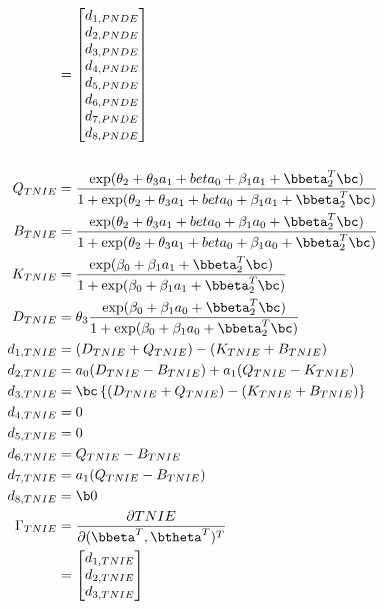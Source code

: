 \documentclass[dvipdfmx,10pt]{article}
\begin{document}
\begin{align*}
  &= \begin{bmatrix}
      d_{1,PNDE}\\
      d_{2,PNDE}\\
      d_{3,PNDE}\\
      d_{4,PNDE}\\
      d_{5,PNDE}\\
      d_{6,PNDE}\\
      d_{7,PNDE}\\
      d_{8,PNDE}\\
    \end{bmatrix}\\
  \\
  Q_{TNIE} &= \frac
      {    \exp(\theta_{2} + \theta_{3}a_{1} + beta_{0} + \beta_{1}a_{1} + \bbeta_{2}^{T}\bc)}
      {1 + \exp(\theta_{2} + \theta_{3}a_{1} + beta_{0} + \beta_{1}a_{1} + \bbeta_{2}^{T}\bc)}\\
  B_{TNIE} &= \frac
      {    \exp(\theta_{2} + \theta_{3}a_{1} + beta_{0} + \beta_{1}a_{0} + \bbeta_{2}^{T}\bc)}
      {1 + \exp(\theta_{2} + \theta_{3}a_{1} + beta_{0} + \beta_{1}a_{0} + \bbeta_{2}^{T}\bc)}\\
  K_{TNIE} &= \frac
      {    \exp(\beta_{0} + \beta_{1}a_{1} + \bbeta_{2}^{T}\bc)}
      {1 + \exp(\beta_{0} + \beta_{1}a_{1} + \bbeta_{2}^{T}\bc)}\\
  D_{TNIE} &= \theta_{3} \frac
      {    \exp(\beta_{0} + \beta_{1}a_{0} + \bbeta_{2}^{T}\bc)}
      {1 + \exp(\beta_{0} + \beta_{1}a_{0} + \bbeta_{2}^{T}\bc)}\\
  d_{1,TNIE} &= (D_{TNIE} + Q_{TNIE}) - (K_{TNIE} + B_{TNIE})\\
  d_{2,TNIE} &= a_{0}(D_{TNIE} - B_{TNIE}) + a_{1}(Q_{TNIE} - K_{TNIE})\\
  d_{3,TNIE} &= \bc \left\{ (D_{TNIE} + Q_{TNIE}) - (K_{TNIE} + B_{TNIE}) \right\}\\
  d_{4,TNIE} &= 0\\
  d_{5,TNIE} &= 0\\
  d_{6,TNIE} &= Q_{TNIE} - B_{TNIE}\\
  d_{7,TNIE} &= a_{1} (Q_{TNIE} - B_{TNIE})\\
  d_{8,TNIE} &= \b0\\
  \Gamma_{TNIE}
  &= \frac{\partial TNIE}{\partial (\bbeta^{T},\btheta^{T})^{T}}\\
  &= \begin{bmatrix}
      d_{1,TNIE}\\
      d_{2,TNIE}\\
      d_{3,TNIE}\\

\end{bmatrix}
\end{align*}
\end{document}
